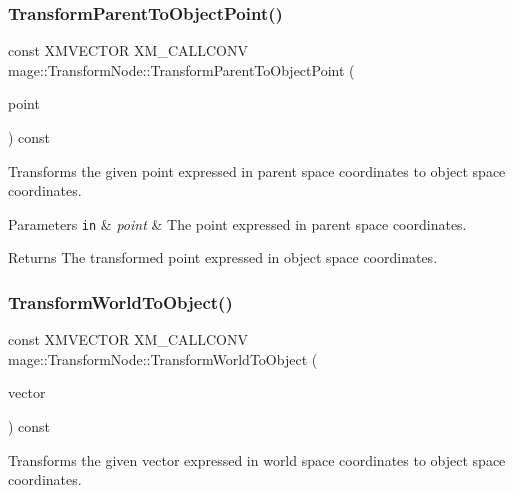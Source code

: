 \subsubsection{\texorpdfstring{Transform\+Parent\+To\+Object\+Point()}{TransformParentToObjectPoint()}}
{\footnotesize\ttfamily const X\+M\+V\+E\+C\+T\+OR X\+M\+\_\+\+C\+A\+L\+L\+C\+O\+NV mage\+::\+Transform\+Node\+::\+Transform\+Parent\+To\+Object\+Point (\begin{DoxyParamCaption}\item[{F\+X\+M\+V\+E\+C\+T\+OR}]{point }\end{DoxyParamCaption}) const\hspace{0.3cm}{\ttfamily [noexcept]}}

Transforms the given point expressed in parent space coordinates to object space coordinates.


\begin{DoxyParams}[1]{Parameters}
\mbox{\tt in}  & {\em point} & The point expressed in parent space coordinates. \\
\hline
\end{DoxyParams}
\begin{DoxyReturn}{Returns}
The transformed point expressed in object space coordinates. 
\end{DoxyReturn}
\hypertarget{structmage_1_1_transform_node_a20d7ef8d49095a4ffddf508cad7d89d1}{}\label{structmage_1_1_transform_node_a20d7ef8d49095a4ffddf508cad7d89d1} 
\subsubsection{\texorpdfstring{Transform\+World\+To\+Object()}{TransformWorldToObject()}}
{\footnotesize\ttfamily const X\+M\+V\+E\+C\+T\+OR X\+M\+\_\+\+C\+A\+L\+L\+C\+O\+NV mage\+::\+Transform\+Node\+::\+Transform\+World\+To\+Object (\begin{DoxyParamCaption}\item[{F\+X\+M\+V\+E\+C\+T\+OR}]{vector }\end{DoxyParamCaption}) const\hspace{0.3cm}{\ttfamily [noexcept]}}

Transforms the given vector expressed in world space coordinates to object space coordinates.


